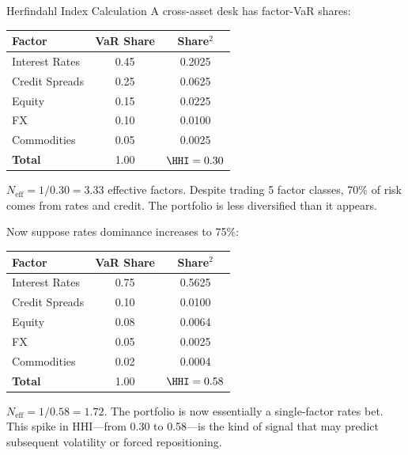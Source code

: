 \begin{workedexample}{Herfindahl Index Calculation}
A cross-asset desk has factor-VaR shares:

\begin{center}
\small
\begin{tabular}{@{}lcc@{}}
\toprule
\textbf{Factor} & \textbf{VaR Share} & \textbf{Share$^2$} \\
\midrule
Interest Rates   & 0.45 & 0.2025 \\
Credit Spreads   & 0.25 & 0.0625 \\
Equity           & 0.15 & 0.0225 \\
FX               & 0.10 & 0.0100 \\
Commodities      & 0.05 & 0.0025 \\
\midrule
\textbf{Total}   & 1.00 & $\HHI = 0.30$ \\
\bottomrule
\end{tabular}
\end{center}

$N_{\text{eff}} = 1/0.30 = 3.33$ effective factors.  Despite
trading 5 factor classes, 70\% of risk comes from rates and credit.
The portfolio is less diversified than it appears.

Now suppose rates dominance increases to 75\%:

\begin{center}
\small
\begin{tabular}{@{}lcc@{}}
\toprule
\textbf{Factor} & \textbf{VaR Share} & \textbf{Share$^2$} \\
\midrule
Interest Rates   & 0.75 & 0.5625 \\
Credit Spreads   & 0.10 & 0.0100 \\
Equity           & 0.08 & 0.0064 \\
FX               & 0.05 & 0.0025 \\
Commodities      & 0.02 & 0.0004 \\
\midrule
\textbf{Total}   & 1.00 & $\HHI = 0.58$ \\
\bottomrule
\end{tabular}
\end{center}

$N_{\text{eff}} = 1/0.58 = 1.72$.  The portfolio is now essentially a
single-factor rates bet.  This spike in HHI---from 0.30 to 0.58---is
the kind of signal that may predict subsequent volatility or forced
repositioning.
\end{workedexample}


